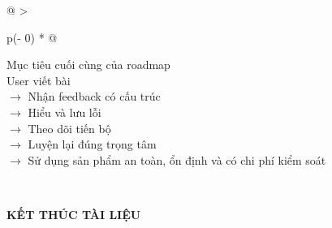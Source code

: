 \documentclass[
  11pt,
  a4paper,
]{article}
\begin{document}
\begin{longtable}[]{@{}
  >{\raggedright\arraybackslash}p{(\columnwidth - 0\tabcolsep) * }@{}}
\toprule\noalign{}
\begin{minipage}[b]{\linewidth}\raggedright
Mục tiêu cuối cùng của roadmap\\
User viết bài\\
\(\rightarrow\) Nhận feedback có cấu trúc\\
\(\rightarrow\) Hiểu và lưu lỗi\\
\(\rightarrow\) Theo dõi tiến bộ\\
\(\rightarrow\) Luyện lại đúng trọng tâm\\
\(\rightarrow\) Sử dụng sản phẩm an toàn, ổn định và có chi phí kiểm soát\strut
\end{minipage} \\
\midrule\noalign{}
\endhead
\bottomrule\noalign{}
\endlastfoot
\end{longtable}

\textbf{KẾT THÚC TÀI LIỆU}
\end{document}
